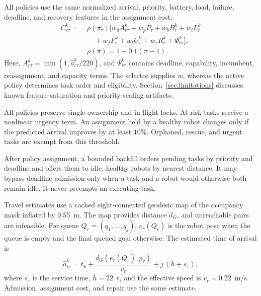 \documentclass[10pt,letterpaper,onecolumn]{IEEEtran}
\begin{document}
All policies use the same normalized arrival, priority, battery, load, failure,
deadline, and recovery features in the assignment cost:
\begin{equation}
\begin{aligned}
  C_{r\tau}^k =\ &\rho(\pi_\tau)\bigl[
  w_dA_{r\tau}^k+w_pP_\tau+w_bB_r^k+w_lL_r^k\\
  &\quad+w_fF_r^k+w_tU_\tau^k+w_rR_r^k+\Psi_{r\tau}^k\bigr],\\
  &\rho(\pi)=1-0.1(\pi-1) .
\end{aligned}
  \label{eq:cost}
\end{equation}
Here, $A_{r\tau}^k=\min(1,\hat a_{r\tau}^k/220)$, and $\Psi_{r\tau}^k$
contains deadline, capability, incumbent, reassignment, and capacity terms.
The selector supplies $w$, whereas the active policy determines task order and
eligibility. Section~\ref{sec:limitations} discusses known feature-saturation
and priority-scaling artifacts.

All policies preserve single ownership and in-flight locks. At-risk tasks
receive a nonlinear urgency term. An assignment held by a healthy robot changes
only if the predicted arrival improves by at least $10\%$. Orphaned, rescue,
and urgent tasks are exempt from this threshold.

After policy assignment, a bounded backfill orders pending tasks by priority
and deadline and offers them to idle, healthy robots by nearest distance. It
may bypass deadline admission only when a task and a robot would otherwise both
remain idle. It never preempts an executing task.

\label{sec:geodesic-repair}

Travel estimates use a cached eight-connected geodesic map of the occupancy
mask inflated by 0.55~m. The map provides distance $d_G$, and unreachable
pairs are infeasible. For queue $Q_r=(q_1,\ldots,q_j)$, $e_r(Q_r)$ is the
robot pose when the queue is empty and the final queued goal otherwise. The
estimated time of arrival is
\begin{equation}
\hat a_{r\tau}^k=t_k+
\frac{d_G(e_r(Q_r),p_\tau)}{v_r}+j\,(h+s_\tau),
\label{eq:eta}
\end{equation}
where $s_\tau$ is the service time, $h=22$~s, and the effective speed is
$v_r=0.22$~m/s. Admission, assignment cost, and repair use the same estimate.
\end{document}
